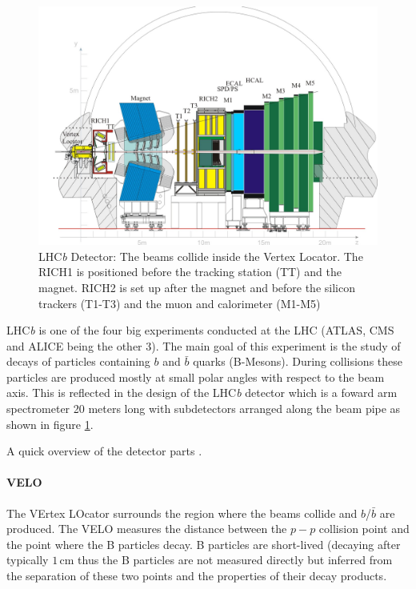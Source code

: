 \documentclass[11pt,twoside]{scrreprt}
\begin{document}
\begin{figure}[tb]
  \centering
  \includegraphics[width=\textwidth]{pics/lhcb_detector}
  \caption{LHC\textit{b} Detector: The beams collide inside the Vertex Locator. The RICH1 is positioned before the tracking station (TT) and
  the magnet. RICH2 is set up after the magnet and before the silicon trackers (T1-T3) and the muon and calorimeter (M1-M5)}
  \label{fig:lhcb}
\end{figure}

LHC\textit{b} is one of the four big experiments conducted at the LHC (ATLAS, CMS and ALICE being the other 3). The main goal of this 
experiment is the study of decays of particles containing $b$ and $\bar{b}$ quarks (B-Mesons). During collisions these particles 
are produced mostly at small polar angles with respect to the beam axis. This is reflected in the design of the LHC\textit{b} detector 
which is a foward arm spectrometer 20 meters long with subdetectors arranged along the beam pipe as shown in figure \ref{fig:lhcb}.

A quick overview of the detector parts \parencite{lhcbweb}.

\paragraph{VELO} The VErtex LOcator surrounds the region where the beams collide and $b$/$\bar{b}$ are produced. The VELO measures the 
distance between the $p-p$ collision point and the point where the B particles decay. B particles are short-lived (decaying after typically
$1$\,cm thus the B particles are not measured directly but inferred from the separation of these two points and the properties of 
their decay products.
\end{document}
